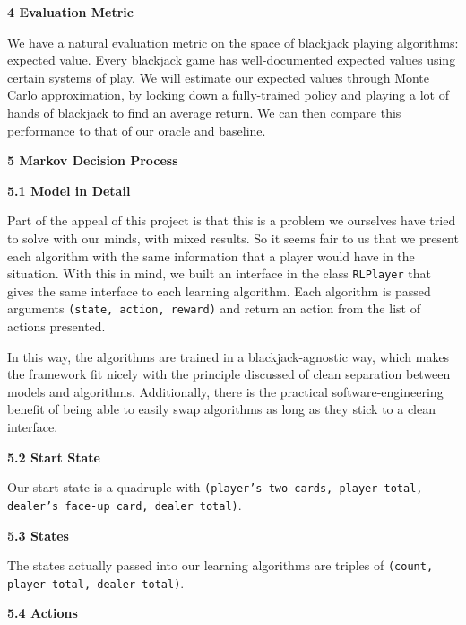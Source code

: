 \documentclass[12pt]{article}
\begin{document}
    {\large \textbf{4 Evaluation Metric}} \newline

    We have a natural evaluation metric on the space of blackjack playing algorithms: expected value. Every blackjack game has well-documented expected values using certain systems of play. We will estimate our expected values through Monte Carlo approximation, by locking down a fully-trained policy and playing a lot of hands of blackjack to find an average return. We can then compare this performance to that of our oracle and baseline. \newline

    {\large \textbf{5 Markov Decision Process}} \newline

    \textbf{5.1 Model in Detail} \newline

    Part of the appeal of this project is that this is a problem we ourselves have tried to solve with our minds, with mixed results. So it seems fair to us that we present each algorithm with the same information that a player would have in the situation. With this in mind, we built an interface in the class \texttt{RLPlayer} that gives the same interface to each learning algorithm. Each algorithm is passed arguments \texttt{(state, action, reward)} and return an action from the list of actions presented. \newline

    In this way, the algorithms are trained in a blackjack-agnostic way, which makes the framework fit nicely with the principle discussed of clean separation between models and algorithms. Additionally, there is the practical software-engineering benefit of being able to easily swap algorithms as long as they stick to a clean interface. \newline

    \textbf{5.2 Start State} \newline

    Our start state is a quadruple with \texttt{(player's two cards, player total, dealer's face-up card, dealer total)}. \pagebreak

    \textbf{5.3 States} \newline

    The states actually passed into our learning algorithms are triples of \texttt{(count, player total, dealer total)}. \newline

    \textbf{5.4 Actions} \newline
\end{document}
